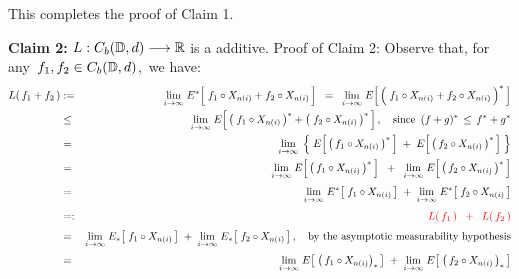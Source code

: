 \vskip 0.5cm
\noindent
This completes the proof of Claim 1.

\vskip 0.5cm
\noindent
\textbf{Claim 2:}\;\;
$L : C_{b}(\mathbb{D},d) \longrightarrow \mathbb{R}$ is a additive.
\vskip 0.2cm
\noindent
Proof of Claim 2:\;\;
Observe that, for any \,$f_{1}, f_{2} \in C_{b}(\mathbb{D},d)$,\, we have:
\begin{eqnarray*}
L(\,f_{1} + f_{2}\,)
&:=&
	\underset{i\rightarrow\infty}{\lim}\;
	E^{*}\!\left[\; f_{1} \circ X_{n(i)} \overset{{\color{white}.}}{+} f_{2} \circ X_{n(i)} \,\right]
\;\; = \;\;
	\underset{i\rightarrow\infty}{\lim}\;
	E\!\left[\,\left(\; f_{1} \circ X_{n(i)} \overset{{\color{white}.}}{+} f_{2} \circ X_{n(i)} \,\right)^{*}\,\right]
\\
& \leq &
	\underset{i\rightarrow\infty}{\lim}\;
	E\!\left[\,\left(\;
		f_{1} \circ X_{n(i)}\,\right)^{*}
		\overset{{\color{white}.}}{+}
		\left(\;f_{2} \circ X_{n(i)}
	\,\right)^{*}\,\right],
	\quad
	\textnormal{since \,$(f + g)^{*} \,\leq\, f^{*} +  g^{*}$}
\\
& \overset{{\color{white}1}}{=} &
	\underset{i\rightarrow\infty}{\lim}\;\left\{\;
	E\!\left[\,\left(\,f_{1} \circ X_{n(i)}\,\right)^{*} \,\right]
	\; + \;
	E\!\left[\,\left(\,f_{2} \circ X_{n(i)}\,\right)^{*} \,\right]
	\;\right\}
\\
& \overset{{\color{white}1}}{=} &
	\underset{i\rightarrow\infty}{\lim}\;
	E\!\left[\,\left(\,f_{1} \circ X_{n(i)}\,\right)^{*} \,\right]
	\;\; + \;\;
	\underset{i\rightarrow\infty}{\lim}\;
	E\!\left[\,\left(\,f_{2} \circ X_{n(i)}\,\right)^{*} \,\right]
\\
& \overset{{\color{white}1}}{=} &
	\underset{i\rightarrow\infty}{\lim}\;
	E^{*}\!\left[\; f_{1} \circ X_{n(i)} \,\right]
	\; + \;
	\underset{i\rightarrow\infty}{\lim}\;
	E^{*}\!\left[\; f_{2} \circ X_{n(i)} \,\right]
\\
& \overset{{\color{white}1}}{=:} &
	{\color{red}L(\,f_{1}\,) \;\; + \;\; L(\,f_{2}\,)}
\\
& \overset{{\color{white}1}}{=} &
	\underset{i\rightarrow\infty}{\lim}\;
	E_{*}\!\left[\; f_{1} \circ X_{n(i)} \,\right]
	\; + \;
	\underset{i\rightarrow\infty}{\lim}\;
	E_{*}\!\left[\; f_{2} \circ X_{n(i)} \,\right],
	\quad\textnormal{by the asymptotic measurability hypothesis}
\\
& \overset{{\color{white}1}}{=} &
	\underset{i\rightarrow\infty}{\lim}\;
	E\!\left[\; \left(\,f_{1} \circ X_{n(i)}\right)_{*} \,\right]
	\; + \;
	\underset{i\rightarrow\infty}{\lim}\;
	E\!\left[\; \left(\,f_{2} \circ X_{n(i)}\,\right)_{*} \,\right]

\end{eqnarray*}
